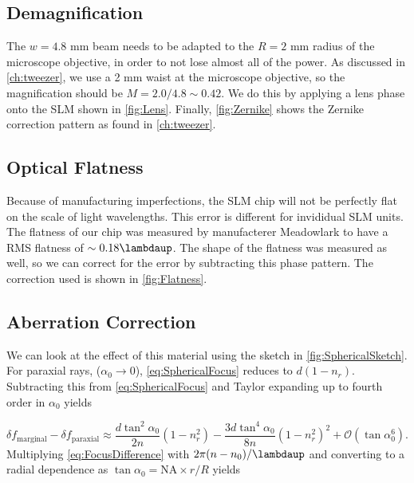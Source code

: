 \subsection{Demagnification}

The $w = 4.8$ mm beam needs to be adapted to the $R = 2$ mm radius of the microscope objective, in order to not lose almost all of the power. 
As discussed in \cref{ch:tweezer}, we use a 2 mm waist at the microscope objective, so the magnification should be $M = 2.0 / 4.8 \sim 0.42$. 
We do this by applying a lens phase onto the SLM shown in \cref{fig:Lens}. 
Finally, \cref{fig:Zernike} shows the Zernike correction pattern as found in \cref{ch:tweezer}.

\subsection{Optical Flatness}\label{subsec:Flatness}

Because of manufacturing imperfections, the SLM chip will not be perfectly flat on the scale of light wavelengths. 
This error is different for invididual SLM units.
The flatness of our chip was measured by manufacterer Meadowlark to have a RMS flatness of $\sim 0.18\lambdaup$.
The shape of the flatness was measured as well, so we can correct for the error by subtracting this phase pattern. 
The correction used is shown in \cref{fig:Flatness}.

\subsection{Aberration Correction}\label{subsec:AberrationCorrection}


We can look at the effect of this material using the sketch in \cref{fig:SphericalSketch}. 
For paraxial rays, ($\alpha_0 \rightarrow 0$), \cref{eq:SphericalFocus} reduces to $d(1-n_r)$. 
Subtracting this from \cref{eq:SphericalFocus} and Taylor expanding up to fourth order in $\alpha_0$ yields 

\begin{equation}\label{eq:FocusDifference}
    \delta f_{\text{marginal}} - \delta f_{\text{paraxial}} \approx
    \frac{d \tan^2{\alpha_0}}{2n} (1-n_r^2) - \frac{3d \tan^4{\alpha_0}}{8n}(1-n_r^2)^2+\mathcal{O}(\tan\alpha_0^6).
\end{equation}
Multiplying \cref{eq:FocusDifference} with $2\pi(n-n_0)/\lambdaup$ and converting to a radial dependence as $\tan{\alpha_0}= \text{NA} \times r/R$ yields \cite{Iwaniuk2011}

